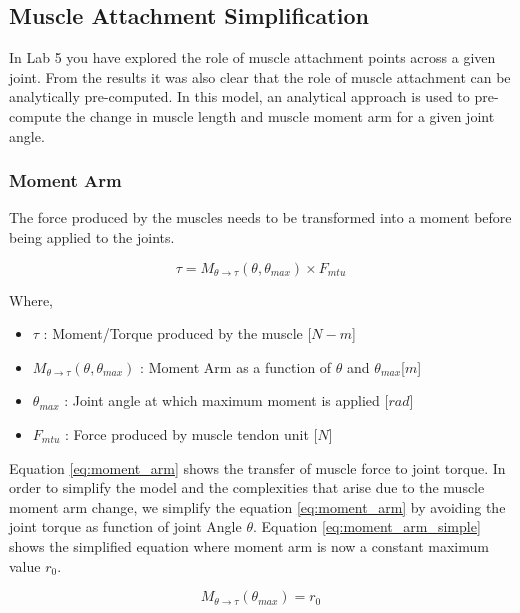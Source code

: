 \documentclass{cmc}
\begin{document}
\subsection*{Muscle Attachment Simplification}
\label{sec:muscle-attachment}

In Lab 5 you have explored the role of muscle attachment points across
a given joint. From the results it was also clear that the role of
muscle attachment can be analytically pre-computed. In this model, an
analytical approach is used to pre-compute the change in muscle length
and muscle moment arm for a given joint angle.

\subsubsection*{Moment Arm}
\label{sec:moment-arm}

The force produced by the muscles needs to be transformed into a
moment before being applied to the joints.

\begin{equation}
  \label{eq:moment_arm}
  \tau = M_{\theta \rightarrow \tau }(\theta, \theta_{max}) \times F_{mtu}
\end{equation}

Where,
\begin{itemize}
\item $\tau$ : Moment/Torque produced by the muscle [$N-m$]
\item $M_{\theta \rightarrow \tau }(\theta, \theta_{max})$ : Moment
  Arm as a function of $\theta$ and $\theta_{max}$[$m$]
\item $\theta_{max}$ : Joint angle at which maximum moment is applied
  [$rad$]
\item $F_{mtu}$ : Force produced by muscle tendon unit [$N$]
\end{itemize}

Equation \ref{eq:moment_arm} shows the transfer of muscle force to
joint torque.  In order to simplify the model and the complexities
that arise due to the muscle moment arm change, we simplify the
equation \ref{eq:moment_arm} by avoiding the joint torque as function
of joint Angle $\theta$. Equation \ref{eq:moment_arm_simple} shows the
simplified equation where moment arm is now a constant maximum value
$r_0$.

\begin{equation}
  \label{eq:r_0}
  M_{\theta \rightarrow \tau}(\theta_{max}) = r_0
\end{equation}
\end{document}
